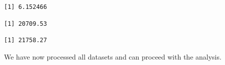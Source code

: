 \begin{verbatim}
[1] 6.152466
\end{verbatim}

\begin{Shaded}
\begin{Highlighting}[]
\SpecialCharTok{\$}
\end{Highlighting}
\end{Shaded}

\begin{verbatim}
[1] 20709.53
\end{verbatim}

\begin{Shaded}
\begin{Highlighting}[]
\SpecialCharTok{\$}
\end{Highlighting}
\end{Shaded}

\begin{verbatim}
[1] 21758.27
\end{verbatim}

We have now processed all datasets and can proceed with the analysis.
